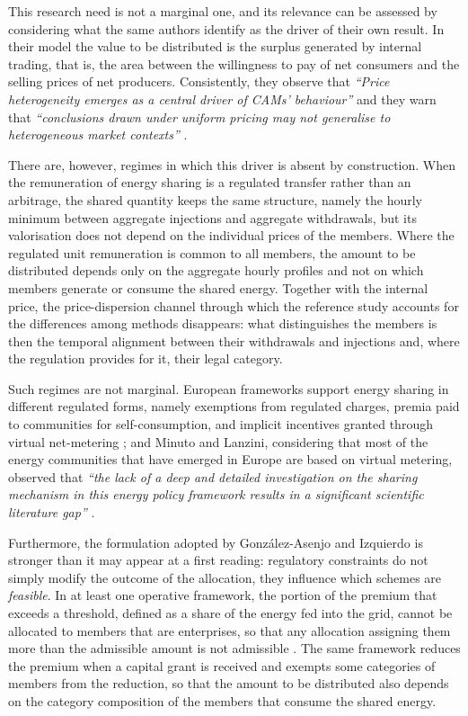 This research need is not a marginal one, and its relevance can be assessed by considering what the same authors identify as the driver of their own result. In their model the value to be distributed is the surplus generated by internal trading, that is, the area between the willingness to pay of net consumers and the selling prices of net producers. Consistently, they observe that \textit{``Price heterogeneity emerges as a central driver of CAMs' behaviour''} and they warn that \textit{``conclusions drawn under uniform pricing may not generalise to heterogeneous market contexts''} \cite{gonzalezAsenjo2026}.

There are, however, regimes in which this driver is absent by construction. When the remuneration of energy sharing is a regulated transfer rather than an arbitrage, the shared quantity keeps the same structure, namely the hourly minimum between aggregate injections and aggregate withdrawals, but its valorisation does not depend on the individual prices of the members. Where the regulated unit remuneration is common to all members, the amount to be distributed depends only on the aggregate hourly profiles and not on which members generate or consume the shared energy. Together with the internal price, the price-dispersion channel through which the reference study accounts for the differences among methods disappears: what distinguishes the members is then the temporal alignment between their withdrawals and injections and, where the regulation provides for it, their legal category.

Such regimes are not marginal. European frameworks support energy sharing in different regulated forms, namely exemptions from regulated charges, premia paid to communities for self-consumption, and implicit incentives granted through virtual net-metering \cite{gjorgievski2023}; and Minuto and Lanzini, considering that most of the energy communities that have emerged in Europe are based on virtual metering, observed that \textit{``the lack of a deep and detailed investigation on the sharing mechanism in this energy policy framework results in a significant scientific literature gap''} \cite{minutoLanzini2022}.

Furthermore, the formulation adopted by González-Asenjo and Izquierdo is stronger than it may appear at a first reading: regulatory constraints do not simply modify the outcome of the allocation, they influence which schemes are \emph{feasible}. In at least one operative framework, the portion of the premium that exceeds a threshold, defined as a share of the energy fed into the grid, cannot be allocated to members that are enterprises, so that any allocation assigning them more than the admissible amount is not admissible \cite{MASE:Decreto:CER:2023}. The same framework reduces the premium when a capital grant is received and exempts some categories of members from the reduction, so that the amount to be distributed also depends on the category composition of the members that consume the shared energy.

